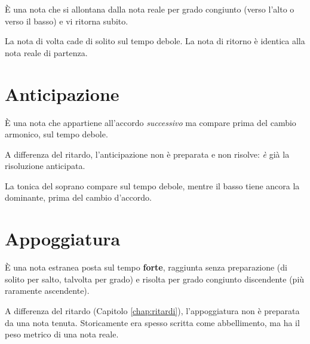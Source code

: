 \begin{definizione}
    È una nota che si allontana dalla nota reale per grado congiunto (verso l'alto o verso il basso) e vi ritorna subito.
\end{definizione}

\begin{regola}
    La nota di volta cade di solito sul tempo debole. La nota di ritorno è identica alla nota reale di partenza.
\end{regola}

\section{Anticipazione}
\label{sec:anticipazione}

\begin{definizione}[Anticipazione]
    È una nota che appartiene all'accordo \textit{successivo} ma compare prima del cambio armonico, sul tempo debole.
\end{definizione}

\begin{regola}
    A differenza del ritardo, l'anticipazione non è preparata e non risolve: \textit{è} già la risoluzione anticipata.
\end{regola}

\begin{esempio}
    La tonica del soprano compare sul tempo debole, mentre il basso tiene ancora la dominante, prima del cambio d'accordo.
\end{esempio}

\section{Appoggiatura}
\label{sec:appoggiatura}

\begin{definizione}[Appoggiatura]
    È una nota estranea posta sul tempo \textbf{forte}, raggiunta senza preparazione (di solito per salto, talvolta per grado) e risolta per grado congiunto discendente (più raramente ascendente).
\end{definizione}

\begin{regola}
    A differenza del ritardo (Capitolo \ref{chap:ritardi}), l'appoggiatura non è preparata da una nota tenuta. Storicamente era spesso scritta come abbellimento, ma ha il peso metrico di una nota reale.
\end{regola}

